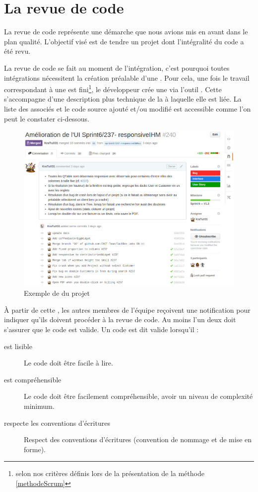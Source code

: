 \section{La revue de code}
La revue de code représente une démarche que nous avions mis en avant dans le plan qualité. L'objectif visé est de tendre un projet dont l'intégralité du code a été revu. 

La revue de code se fait au moment de l'intégration, c'est pourquoi toutes intégrations nécessitent la création préalable d'une \PullRequest. Pour cela, une fois le travail correspondant à une \UserStory{} est fini\footnote{selon nos critères définis lors de la présentation de la méthode \Scrum{} \ref{methodeScrum}}, le développeur crée une \PullRequest{} via l'outil \Github. Cette \PullRequest s'accompagne d'une description plus technique de la \UserStory{} à laquelle elle est liée. La liste des \Commits{} associés et le code source ajouté et/ou modifié est accessible comme l'on peut le constater ci-dessous. 
\begin{figure}[H]
	\centering
	\includegraphics[width=0.7\linewidth]{screens/creation_pr_github}
	\caption{Exemple de \PullRequest{} du projet \FactDev}
	\label{fig:creation_pr_github}
\end{figure}

\`A partir de cette \PullRequest, les autres membres de l'équipe reçoivent une notification pour indiquer qu'ils doivent procéder à la revue de code. Au moins l'un deux doit s'assurer que le code est valide. Un code est dit valide lorsqu'il :
\begin{description}
	\item[est lisible] Le code doit être facile à lire. 
	\item[est compréhensible] Le code doit être facilement compréhensible, avoir un niveau de complexité minimum.
	\item[respecte les conventions d'écritures] Respect des conventions d'écritures (convention de nommage et de mise en forme).
\end{description}

